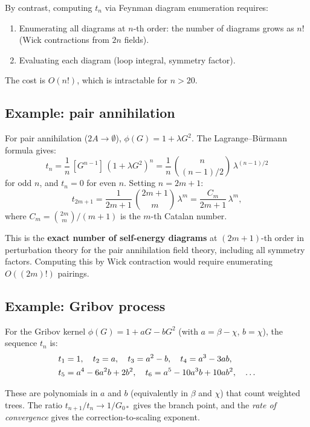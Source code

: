 \documentclass[11pt,a4paper]{article}
\theoremstyle{definition}
\begin{document}
By contrast, computing $t_n$ via Feynman diagram enumeration requires:
\begin{enumerate}[leftmargin=2em]
\item Enumerating all diagrams at $n$-th order: the number of diagrams
grows as $n!$ (Wick contractions from $2n$ fields).
\item Evaluating each diagram (loop integral, symmetry factor).
\end{enumerate}
The cost is $O(n!)$, which is intractable for $n > 20$.

\subsection{Example: pair annihilation}

For pair annihilation ($2A \to \emptyset$), $\phi(G) = 1 + \lambda G^2$.
The Lagrange--B\"urmann formula gives:
\begin{equation}
t_n = \frac{1}{n}\,[G^{n-1}]\,(1 + \lambda G^2)^n
= \frac{1}{n}\,\binom{n}{(n-1)/2}\,\lambda^{(n-1)/2}
\end{equation}
for odd $n$, and $t_n = 0$ for even $n$. Setting $n = 2m+1$:
\begin{equation}
t_{2m+1} = \frac{1}{2m+1}\,\binom{2m+1}{m}\,\lambda^m
= \frac{C_m}{2m+1}\,\lambda^m,
\end{equation}
where $C_m = \binom{2m}{m}/(m+1)$ is the $m$-th Catalan number.

This is the \textbf{exact number of self-energy diagrams} at $(2m+1)$-th
order in perturbation theory for the pair annihilation field theory,
including all symmetry factors. Computing this by Wick contraction would
require enumerating $O((2m)!)$ pairings.

\subsection{Example: Gribov process}

For the Gribov kernel $\phi(G) = 1 + aG - bG^2$ (with $a = \beta - \chi$,
$b = \chi$), the sequence $t_n$ is:
\begin{align}
t_1 &= 1, \quad t_2 = a, \quad t_3 = a^2 - b, \quad
t_4 = a^3 - 3ab, \notag\\
t_5 &= a^4 - 6a^2 b + 2b^2, \quad
t_6 = a^5 - 10a^3 b + 10ab^2, \quad \ldots
\end{align}

These are polynomials in $a$ and $b$ (equivalently in $\beta$ and $\chi$)
that count weighted trees. The ratio $t_{n+1}/t_n \to 1/G_{0*}$ gives
the branch point, and the \emph{rate of convergence} gives the
correction-to-scaling exponent.
\end{document}
